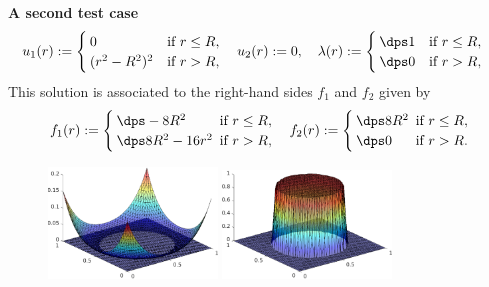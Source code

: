 \begin{frame}
  \textcolor{cadmiumgreen}{\textbf{A second test case}}
  \begin{align*}
  u_1(r) 
  &\egaldef 
    \begin{cases}
      0 & \text{if } r \leq R ,
      \\
      (r^2 - R^2)^2 &\text{if } r > R ,
    \end{cases}
  \quad
  u_2(r) 
  \egaldef 0 ,
\quad
\lambda(r) \egaldef
\begin{cases}
 \dps 1 & \mbox{if } r \leq R,\\
\dps 0 &\mbox{if } r > R,\\
\end{cases}
\end{align*}
This solution is associated to the right-hand sides $f_1$ and $f_2$ given by
\begin{align*}
f_1(r) \egaldef
\begin{cases}
\dps - 8 R^2  &\hspace*{-0.5em}\mbox{if } r \leq R,\\
\dps 8 R^2 - 16 r^2  &\hspace*{-0.5em}\mbox{if } r > R,\\
\end{cases}
\quad
f_2(r) \egaldef
\begin{cases}
\dps 8 R^2 &\hspace*{-0.5em}\mbox{if } r \leq R,\\
\dps 0
&\hspace*{-0.5em}\mbox{if } r > R.\\
\end{cases}
\end{align*}
\vspace*{-0.6 cm}
\begin{figure}
\centering
\includegraphics[width=0.40\textwidth]{membrane_P2} \qquad \qquad
\includegraphics[width=0.40\textwidth]{Lambda_P2}
\end{figure}
\end{frame}

